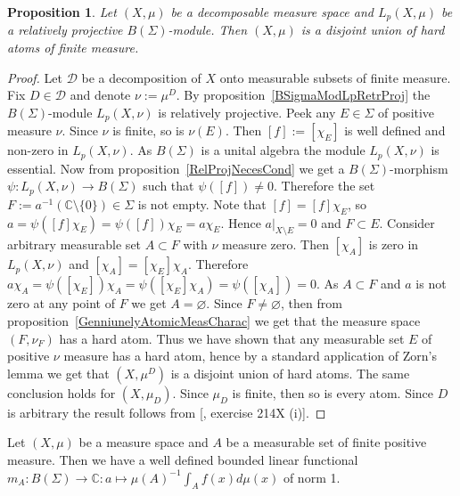 \documentclass[12pt]{article}
\newtheorem{proposition}[theorem]{Proposition}
\begin{document}
\begin{proposition}\label{LpBSigmaModNecessCond} Let $(X,\mu)$ be a decomposable
    measure space and $L_p(X,\mu)$ be a relatively projective
    $B(\Sigma)$-module. Then $(X,\mu)$ is a disjoint union of hard atoms of
    finite measure.
\end{proposition}
\begin{proof} Let $\mathcal{D}$ be a decomposition of $X$ onto measurable
    subsets of finite measure. Fix $D\in\mathcal{D}$ and denote $\nu:=\mu^D$. By
    proposition~\ref{BSigmaModLpRetrProj} the $B(\Sigma)$-module $L_p(X,\nu)$ is
    relatively projective. Peek any $E\in\Sigma$ of positive measure $\nu$.
    Since $\nu$ is finite, so is $\nu(E)$. Then $[f]:=[\chi_E]$ is well defined
    and non-zero in $L_p(X,\nu)$. As $B(\Sigma)$ is a unital algebra the module
    $L_p(X,\nu)$ is essential. Now from proposition~\ref{RelProjNecesCond} we
    get a $B(\Sigma)$-morphism $\psi:L_p(X,\nu)\to B(\Sigma)$ such that
    $\psi([f])\neq 0$. Therefore the set $F:=a^{-1}(\mathbb{C}\setminus
        \{0\})\in\Sigma$ is not empty. Note that $[f]=[f]\chi_E$, so
    $a=\psi([f]\chi_E)=\psi([f])\chi_E=a\chi_E$. Hence $a|_{X\setminus E}=0$ and
    $F\subset E$. Consider arbitrary measurable set $A\subset F$ with $\nu$
    measure zero. Then $[\chi_A]$ is zero in $L_p(X,\nu)$ and
    $[\chi_A]=[\chi_E]\chi_A$. Therefore
    $a\chi_A=\psi([\chi_E])\chi_A=\psi([\chi_E]\chi_A)=\psi([\chi_A])=0$. As
    $A\subset F$ and $a$ is not zero at any point of $F$ we get $A=\varnothing$.
    Since $F\neq \varnothing$, then from
    proposition~\ref{GenniunelyAtomicMeasCharac} we get that the measure space
    $(F,\nu_F)$ has a hard atom. Thus we have shown that any measurable set $E$
    of positive $\nu$ measure has a hard atom, hence by a standard application
    of Zorn's lemma we get that $(X,\mu^D)$ is a disjoint union of hard atoms.
    The same conclusion holds for $(X,\mu_D)$. Since $\mu_D$ is finite, then so
    is every atom. Since $D$ is arbitrary the result follows from
        [\cite{FremMeasTh2}, exercise 214X (i)].
\end{proof}

Let $(X,\mu)$ be a measure space and $A$ be a measurable set of finite positive
measure. Then we have a well defined bounded linear functional
$m_A:B(\Sigma)\to\mathbb{C}:a\mapsto {\mu(A)}^{-1}\int_A f(x)d\mu(x)$ of norm 1.
\end{document}
